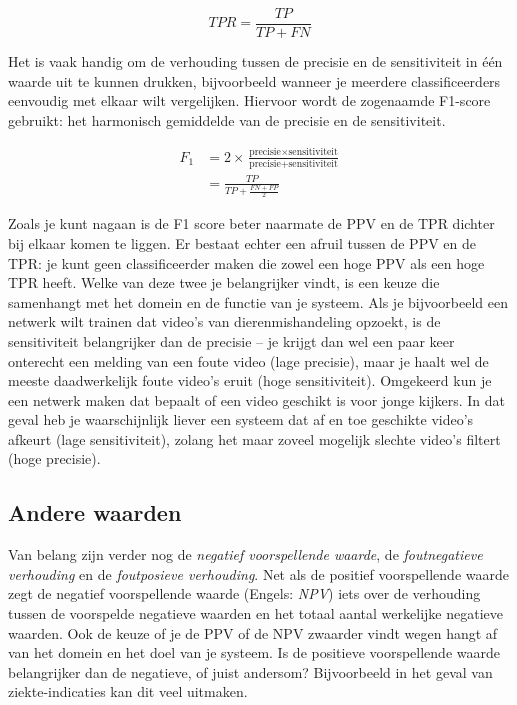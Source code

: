 \[
  TPR = \frac{TP}{TP+FN}
\]

Het is vaak handig om de verhouding tussen de precisie en de sensitiviteit in één waarde uit te kunnen drukken, bijvoorbeeld wanneer je meerdere classificeerders eenvoudig met elkaar wilt vergelijken. Hiervoor wordt de zogenaamde F1-score gebruikt: het harmonisch gemiddelde van de precisie en de sensitiviteit.

\[
\begin{aligned}
  F_1 &= 2 \times \frac {\text{precisie}\times\text{sensitiviteit}}{\text{precisie}+\text{sensitiviteit}}\\
 &= \frac {TP}{TP+\frac{FN+FP}{2}}
\end{aligned}
\]

Zoals je kunt nagaan is de F1 score beter naarmate de PPV en de TPR dichter bij elkaar komen te liggen. Er bestaat echter een afruil tussen de PPV en de TPR: je kunt geen classificeerder maken die zowel een hoge PPV als een hoge TPR heeft. Welke van deze twee je belangrijker vindt, is een keuze die samenhangt met het domein en de functie van je systeem. Als je bijvoorbeeld een netwerk wilt trainen dat video's van dierenmishandeling opzoekt, is de sensitiviteit belangrijker dan de precisie – je krijgt dan wel een paar keer onterecht een melding van een foute video (lage precisie), maar je haalt wel de meeste daadwerkelijk foute video's eruit (hoge sensitiviteit). Omgekeerd kun je een netwerk maken dat bepaalt of een video geschikt is voor jonge kijkers. In dat geval heb je waarschijnlijk liever een systeem dat af en toe geschikte video's afkeurt (lage sensitiviteit), zolang het maar zoveel mogelijk slechte video's filtert (hoge precisie). 

\subsection{Andere waarden}
Van belang zijn verder nog de \textit{negatief voorspellende waarde}, de \textit{foutnegatieve verhouding} en de \textit{foutposieve verhouding}. Net als de positief voorspellende waarde zegt de negatief voorspellende waarde (Engels: \textit{NPV}) iets over de verhouding tussen de voorspelde negatieve waarden en het totaal aantal werkelijke negatieve waarden. Ook de keuze of je de PPV of de NPV zwaarder vindt wegen hangt af van het domein en het doel van je systeem. Is de positieve voorspellende waarde belangrijker dan de negatieve, of juist andersom? Bijvoorbeeld in het geval van ziekte-indicaties kan dit veel uitmaken.

